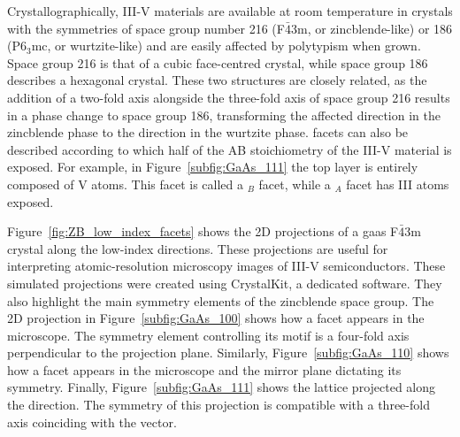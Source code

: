 Crystallographically, III-V materials are available at room temperature in crystals with the symmetries of space group number \num{216} (F\(\bar{4}\)3m, or zincblende-like) or \num{186} (P6\(_3\)mc, or wurtzite-like) and are easily affected by polytypism when grown. Space group \num{216} is that of a cubic face-centred crystal, while space group \num{186} describes a hexagonal crystal. These two structures are closely related, as the addition of a two-fold axis alongside the three-fold axis of space group \num{216} results in a phase change to space group \num{186}, transforming the affected  direction in the zincblende phase to the  direction in the wurtzite phase.  facets can also be described according to which half of the AB stoichiometry of the III-V material is exposed. For example, in Figure~\ref{subfig:GaAs_111} the top layer is entirely composed of V atoms. This facet is called a \(_B\) facet, while a \(_A\) facet has III atoms exposed.

Figure~\ref{fig:ZB_low_index_facets} shows the 2D projections of a \acs{gaas} F\(\bar{4}\)3m crystal along the low-index directions. These projections are useful for interpreting atomic-resolution microscopy images of III-V semiconductors. These simulated projections were created using CrystalKit, a dedicated software. They also highlight the main symmetry elements of the zincblende space group. The 2D projection in Figure~\ref{subfig:GaAs_100} shows how a  facet appears in the microscope. The symmetry element controlling its motif is a four-fold axis perpendicular to the projection plane. Similarly, Figure~\ref{subfig:GaAs_110} shows how a  facet appears in the microscope and the mirror plane dictating its symmetry. Finally, Figure~\ref{subfig:GaAs_111} shows the lattice projected along the  direction. The symmetry of this projection is compatible with a three-fold axis coinciding with the  vector.

